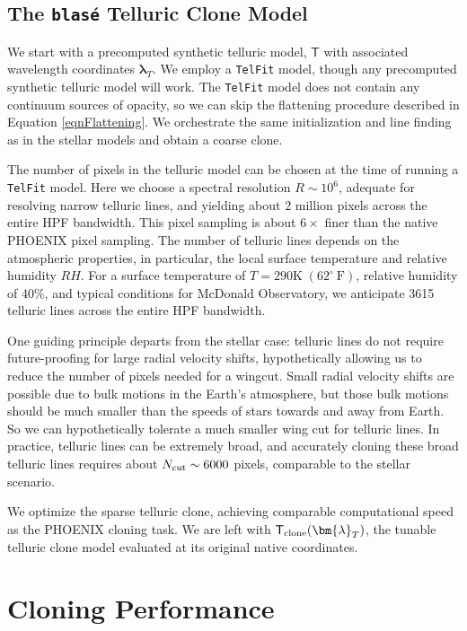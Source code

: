 \documentclass[modern]{aastex631}
\begin{document}
\subsection{The \texttt{blas\'e} Telluric Clone Model}
We start with a precomputed synthetic telluric model, $\mathsf{T}$ with associated wavelength coordinates $\bm{\lambda}_T$.  We employ a \texttt{TelFit} model, though any precomputed synthetic telluric model will work.  The \texttt{TelFit} model does not contain any continuum sources of opacity, so we can skip the flattening procedure described in Equation \ref{eqnFlattening}.  We orchestrate the same initialization and line finding as in the stellar models and obtain a coarse clone.

The number of pixels in the telluric model can be chosen at the time of running a \texttt{TelFit} model.  Here we choose a spectral resolution $R\sim10^6$, adequate for resolving narrow telluric lines, and yielding about 2 million pixels across the entire HPF bandwidth.  This pixel sampling is about $6\times$ finer than the native PHOENIX pixel sampling.  The number of telluric lines depends on the atmospheric properties, in particular, the local surface temperature and relative humidity $RH$.  For a surface temperature of $T=290 \mathrm{K}\; (62^\circ~\mathrm{F})$, relative humidity of 40\%, and typical conditions for McDonald Observatory, we anticipate 3615 telluric lines across the entire HPF bandwidth.

One guiding principle departs from the stellar case: telluric lines do not require future-proofing for large radial velocity shifts, hypothetically allowing us to reduce the number of pixels needed for a wingcut.  Small radial velocity shifts are possible due to bulk motions in the Earth's atmosphere, but those bulk motions should be much smaller than the speeds of stars towards and away from Earth.  So we can hypothetically tolerate a much smaller wing cut for telluric lines.  In practice, telluric lines can be extremely broad, and accurately cloning these broad telluric lines requires about $N_{\rm cut}\sim6000$ pixels, comparable to the stellar scenario.

We optimize the sparse telluric clone, achieving comparable computational speed as the PHOENIX cloning task.  We are left with $\mathsf{T}_{\rm clone}(\bm{\lambda}_T)$, the tunable telluric clone model evaluated at its original native coordinates.


\section{Cloning Performance}
\end{document}
